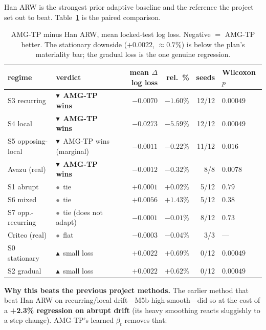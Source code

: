 \documentclass[11pt]{article}
\newcommand{\win}{\textcolor{green!45!black}{$\blacktriangledown$}}
\newcommand{\loss}{\textcolor{red!70!black}{$\blacktriangle$}}
\newcommand{\tie}{\textcolor{gray}{$\bullet$}}
\newcommand{\dd}{$\Delta$}
\begin{document}
Han ARW is the strongest prior adaptive baseline and the reference the project
set out to beat. Table~\ref{tab:vshan} is the paired comparison.

\begin{table}[H]
\centering
\small
\begin{tabular}{@{}llrrrl@{}}
\toprule
regime & verdict & mean \dd{} log loss & rel.\ \% & seeds & Wilcoxon $p$ \\
\midrule
S3 recurring      & \win\ \textbf{AMG-TP wins}     & $-0.0070$ & $-1.60\%$ & 12/12 & $0.00049$ \\
S4 local          & \win\ \textbf{AMG-TP wins}     & $-0.0273$ & $-5.59\%$ & 12/12 & $0.00049$ \\
S5 opposing-local & \win\ AMG-TP wins (marginal)   & $-0.0011$ & $-0.22\%$ & 11/12 & $0.016$ \\
Avazu (real)      & \win\ \textbf{AMG-TP wins}     & $-0.0012$ & $-0.32\%$ & 8/8   & $0.0078$ \\
S1 abrupt         & \tie\ tie                      & $+0.0001$ & $+0.02\%$ & 5/12  & $0.79$ \\
S6 mixed          & \tie\ tie                      & $+0.0056$ & $+1.43\%$ & 5/12  & $0.38$ \\
S7 opp.-recurring & \tie\ tie (does not adapt)     & $-0.0001$ & $-0.01\%$ & 8/12  & $0.73$ \\
Criteo (real)     & \tie\ flat                     & $-0.0003$ & $-0.04\%$ & 3/3   & --- \\
S0 stationary     & \loss\ small loss             & $+0.0022$ & $+0.69\%$ & 0/12  & $0.00049$ \\
S2 gradual        & \loss\ small loss             & $+0.0022$ & $+0.62\%$ & 0/12  & $0.00049$ \\
\bottomrule
\end{tabular}
\caption{AMG-TP minus Han ARW, mean locked-test log loss. Negative $=$ AMG-TP
better. The stationary downside ($+0.0022$, $\approx 0.7\%$) is below the plan's
materiality bar; the gradual loss is the one genuine regression.}
\label{tab:vshan}
\end{table}

\noindent\textbf{Why this beats the previous project methods.} The earlier
method that beat Han ARW on recurring/local drift---M5b-high-smooth---did so at
the cost of a \textbf{+2.3\% regression on abrupt drift} (its heavy smoothing
reacts sluggishly to a step change). AMG-TP's learned $\beta_t$ removes that:
\end{document}
